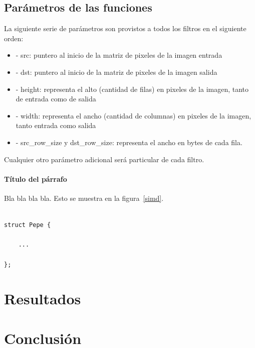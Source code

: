 \documentclass[a4paper]{article}
\newenvironment{codesnippet}{%
	\begin{Sbox}\begin{minipage}{\textwidth}\sffamily\small}%
	{\end{minipage}\end{Sbox}%
		\begin{center}%
		\vspace{-0.4cm}\colorbox{litegrey}{\TheSbox}\end{center}\vspace{0.3cm}}
\begin{document}
\subsection{Parámetros de las funciones}
La siguiente serie de parámetros son provistos a todos los filtros en el siguiente orden:
\begin{itemize}
    \item - src: puntero al inicio de la matriz de pixeles de la imagen entrada
    \item - dst: puntero al inicio de la matriz de pixeles de la imagen salida
    \item - height: representa el alto (cantidad de filas) en pixeles de la imagen, tanto de entrada como de salida
    \item - width: representa el ancho (cantidad de columnas) en pixeles de la imagen, tanto entrada como salida
    \item - src_row_size y dst_row_size: representa el ancho en bytes de cada fila.
\end{itemize}
 Cualquier otro parámetro adicional será particular de cada filtro.







\newpage
\paragraph{\textbf{Título del párrafo} } Bla bla bla bla.
Esto se muestra en la figura~\ref{simd}.



\begin{codesnippet}
\begin{verbatim}

struct Pepe {

    ...

};

\end{verbatim}
\end{codesnippet}

\newpage
\section{Resultados}
%

\newpage
\section{Conclusión}
\end{document}
